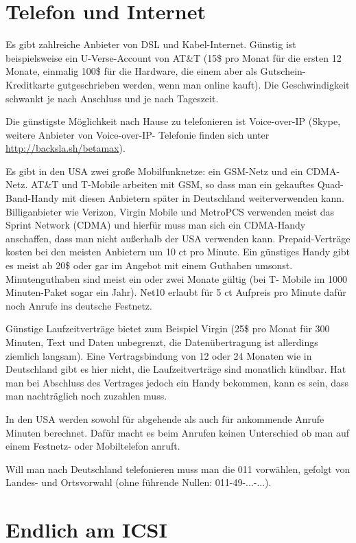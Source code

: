 \documentclass[a4paper]{scrreprt}
\begin{document}
\section{Telefon und Internet}

Es gibt zahlreiche Anbieter von DSL und Kabel-Internet. Günstig ist beispielsweise ein U-Verse-Account von AT\&T (15\$ pro Monat für die ersten 12 Monate, einmalig 100\$ für die Hardware, die einem aber als Gutschein-Kreditkarte gutgeschrieben werden, wenn man online kauft). Die Geschwindigkeit schwankt je nach Anschluss und je nach Tageszeit.

Die günstigste Möglichkeit nach Hause zu telefonieren ist Voice-over-IP (Skype, weitere Anbieter von Voice-over-IP- Telefonie finden sich unter  \url{http://backsla.sh/betamax}).

Es gibt in den USA zwei große Mobilfunknetze: ein GSM-Netz und ein CDMA-Netz. AT\&T und T-Mobile arbeiten mit GSM, so dass man ein gekauftes Quad-Band-Handy mit diesen Anbietern später in Deutschland weiterverwenden kann. Billiganbieter wie Verizon, Virgin Mobile und MetroPCS verwenden meist das Sprint Network (CDMA) und hierfür muss man sich ein CDMA-Handy anschaffen, dass man nicht außerhalb der USA verwenden kann.
Prepaid-Verträge kosten bei den meisten Anbietern um 10 ct pro Minute. Ein günstiges Handy gibt es meist ab 20\$ oder gar im Angebot mit einem Guthaben umsonst. Minutenguthaben sind meist ein oder zwei Monate gültig (bei T- Mobile im 1000 Minuten-Paket sogar ein Jahr). Net10 erlaubt für 5 ct Aufpreis pro Minute dafür noch Anrufe ins deutsche Festnetz.

Günstige Laufzeitverträge bietet zum Beispiel Virgin (25\$ pro Monat für 300 Minuten, Text und Daten unbegrenzt, die Datenübertragung ist allerdings ziemlich langsam). Eine Vertragsbindung von 12 oder 24 Monaten wie in Deutschland gibt es hier nicht, die Laufzeitverträge sind monatlich kündbar. Hat man bei Abschluss des Vertrages jedoch ein Handy bekommen, kann es sein, dass man nachträglich noch zuzahlen muss.

In den USA werden sowohl für abgehende als auch für ankommende Anrufe Minuten berechnet. Dafür macht es beim Anrufen keinen Unterschied ob man auf einem Festnetz- oder Mobiltelefon anruft.

Will man nach Deutschland telefonieren muss man die 011 vorwählen, gefolgt von Landes- und Ortsvorwahl (ohne führende Nullen: 011-49-...-...).

\section{Endlich am ICSI}
\end{document}

